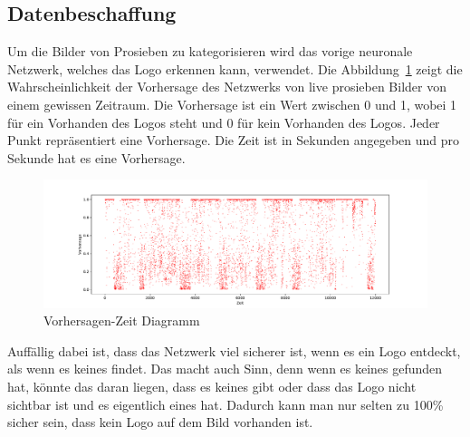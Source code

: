 \documentclass[12pt,a4paper]{report}
\begin{document}
\subsection{Datenbeschaffung}
Um die Bilder von Prosieben zu kategorisieren wird das vorige neuronale Netzwerk,
welches das Logo erkennen kann, verwendet.
Die Abbildung~\ref{fig:points} zeigt die Wahrscheinlichkeit der Vorhersage des Netzwerks von live prosieben Bilder von einem gewissen Zeitraum.
Die Vorhersage ist ein Wert zwischen 0 und 1, wobei 1 für ein Vorhanden des Logos steht und 0 für kein Vorhanden des Logos.
Jeder Punkt repräsentiert eine Vorhersage.
Die Zeit ist in Sekunden angegeben und pro Sekunde hat es eine Vorhersage.
\begin{figure}[h]%
    \centering
    \includegraphics[width=1.0\textwidth]{assets/python/points.pdf}%
    \caption{Vorhersagen-Zeit Diagramm}%
    \label{fig:points}%
\end{figure}
Auffällig dabei ist, dass das Netzwerk viel sicherer ist, wenn es ein Logo entdeckt, als wenn es keines findet.
Das macht auch Sinn, denn wenn es keines gefunden hat, könnte das daran liegen,
dass es keines gibt oder dass das Logo nicht sichtbar ist und es eigentlich eines hat.
Dadurch kann man nur selten zu 100\% sicher sein, dass kein Logo auf dem Bild vorhanden ist.
\end{document}
